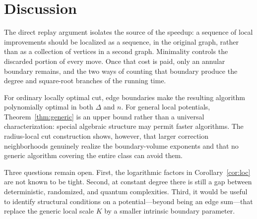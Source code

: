 \documentclass[11pt]{article}
\theoremstyle{definition}
\theoremstyle{remark}
\begin{document}
\section{Discussion}

The direct replay argument isolates the source of the speedup: a sequence of local
improvements should be localized as a sequence, in the original graph, rather than
as a collection of vertices in a second graph.  Minimality controls the discarded
portion of every move.  Once that cost is paid, only an annular boundary remains,
and the two ways of counting that boundary produce the degree and square-root
branches of the running time.

For ordinary locally optimal cut, edge boundaries make the resulting algorithm
polynomially optimal in both $\Delta$ and $n$.  For general local potentials,
Theorem~\ref{thm:generic} is an upper bound rather than a universal characterization:
special algebraic structure may permit faster algorithms.  The radius-local cut
construction shows, however, that larger correction neighborhoods genuinely realize
the boundary-volume exponents and that no generic algorithm covering the entire
class can avoid them.

Three questions remain open.  First, the logarithmic factors in
Corollary~\ref{cor:loc} are not known to be tight.  Second, at constant degree there
is still a gap between deterministic, randomized, and quantum complexities.  Third,
it would be useful to identify structural conditions on a potential---beyond being
an edge sum---that replace the generic local scale $K$ by a smaller intrinsic
boundary parameter.
\end{document}
